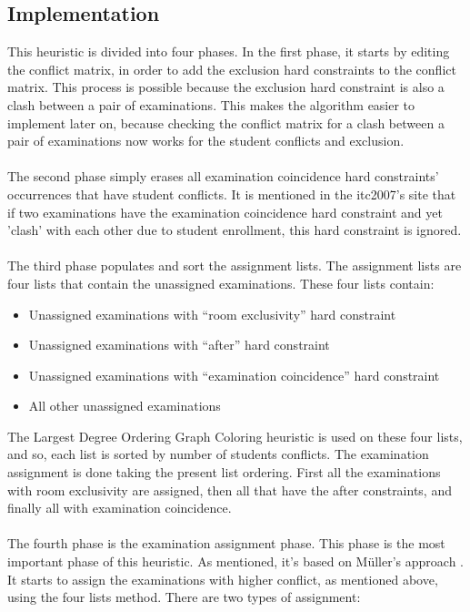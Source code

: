 \subsection{Implementation}

This heuristic is divided into four phases. In the first phase, it starts by editing the conflict matrix, in order to add the exclusion hard constraints to the conflict matrix. This process is possible because the exclusion hard constraint is also a clash between a pair of examinations. This makes the algorithm easier to implement later on, because checking the conflict matrix for a clash between a pair of examinations now works for the student conflicts and exclusion.\\
\\
The second phase simply erases all examination coincidence hard constraints' occurrences that have student conflicts. It is mentioned in the \gls{itc2007}'s site \cite{McCollum2007d} that if two examinations have the examination coincidence hard constraint and yet 'clash' with each other due to student enrollment, this hard constraint is ignored.\\
\\
The third phase populates and sort the assignment lists. The assignment lists are four lists that contain the unassigned examinations. These four lists contain:
\begin{itemize}
	\item Unassigned examinations with ``room exclusivity'' hard constraint
	\item Unassigned examinations with ``after'' hard constraint
	\item Unassigned examinations with ``examination coincidence'' hard constraint
	\item All other unassigned examinations
\end{itemize}
The Largest Degree Ordering Graph Coloring heuristic is used on these four lists, and so, each list is sorted by number of students conflicts. The examination assignment is done taking the present list ordering. First all the examinations with room exclusivity are assigned, then all that have the after constraints, and finally all with examination coincidence.\\
\\
The fourth phase is the examination assignment phase. This phase is the most important phase of this heuristic. As mentioned, it's based on 
M\"{u}ller's approach \cite{Mueller2009}. It starts to assign the examinations with higher conflict, as mentioned above, using the four lists method. There are two types of assignment:
